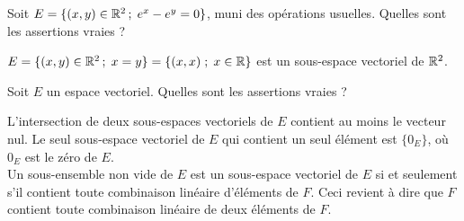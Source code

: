 \begin{question}
Soit $E=\{(x,y) \in \mathbb{R}^2 \,  ;\;  e^x-e^y=0\}$, muni des opérations usuelles. Quelles sont les assertions vraies ?
\begin{answers}  
\end{answers}
\begin{explanations} $E=\{(x,y) \in \mathbb{R}^2 \, ; \;  x=y \} =\{(x,x) \;   ; \;  x \in \mathbb{R} \} $ est 
un sous-espace vectoriel de $\mathbb{R}^2$.
\end{explanations}
\end{question}



\begin{question}
Soit $E$ un espace vectoriel. Quelles sont les assertions vraies ?
\begin{answers}  
\end{answers}
\begin{explanations} L'intersection de deux sous-espaces vectoriels de $E$ contient au moins le vecteur nul. 
Le seul sous-espace vectoriel de $E$ qui contient un seul élément est $\{0_E\}$, où $0_E$ est le zéro de $E$.\\
Un sous-ensemble non vide de $E$ est un sous-espace vectoriel de $E$ si et seulement
s'il contient toute combinaison linéaire d'éléments de $F$. Ceci revient à dire que $F$ contient 
toute combinaison linéaire de deux éléments de $F$.
\end{explanations}
\end{question}



